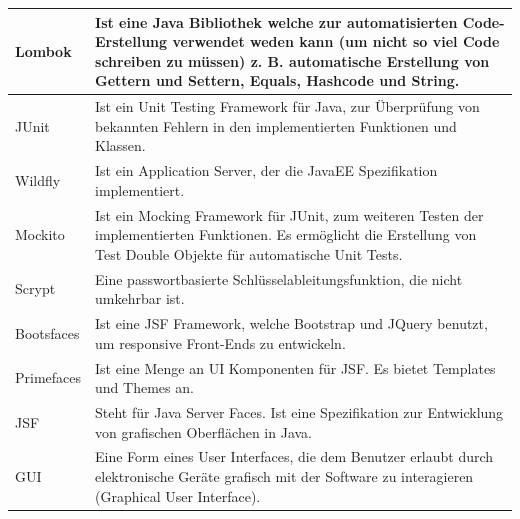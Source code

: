 \documentclass[enabledeprecatedfontcommands,fontsize=12pt,paper=a4,twoside]{scrartcl}
\begin{document}
\begin{longtable}[c]{|p{7cm}|p{8cm}|}
Lombok                                 & Ist eine Java Bibliothek welche zur automatisierten Code-Erstellung verwendet weden kann (um nicht so viel Code schreiben zu müssen) z. B. automatische Erstellung von Gettern und Settern, Equals, Hashcode und String. \\ \hline
JUnit                                  & Ist ein Unit Testing Framework für Java, zur Überprüfung von bekannten Fehlern in den implementierten Funktionen und Klassen.                                                                                          \\ \hline
Wildfly                                & Ist ein Application Server, der die JavaEE Spezifikation implementiert.                                                                                                                                                 \\ \hline
Mockito                                & Ist ein Mocking Framework für JUnit, zum weiteren Testen der implementierten Funktionen. Es ermöglicht die Erstellung von Test Double Objekte für automatische Unit Tests.                                              \\ \hline
Scrypt                                 & Eine passwortbasierte Schlüsselableitungsfunktion, die nicht umkehrbar ist.                                                                                                                                             \\ \hline
Bootsfaces                             & Ist eine JSF Framework, welche Bootstrap und JQuery benutzt, um responsive Front-Ends zu entwickeln.                                                                                                                      \\ \hline
Primefaces                             & Ist eine Menge an UI Komponenten für JSF. Es bietet Templates und Themes an.                                                                                                                                            \\ \hline
JSF                                    & Steht für Java Server Faces. Ist eine Spezifikation zur Entwicklung von grafischen Oberflächen in Java.                                                                                                                \\ \hline
GUI                                    & Eine Form eines User Interfaces, die dem Benutzer erlaubt durch elektronische Geräte grafisch mit der Software zu interagieren (Graphical User Interface).                                                         \\ \hline

\end{longtable}
\end{document}
